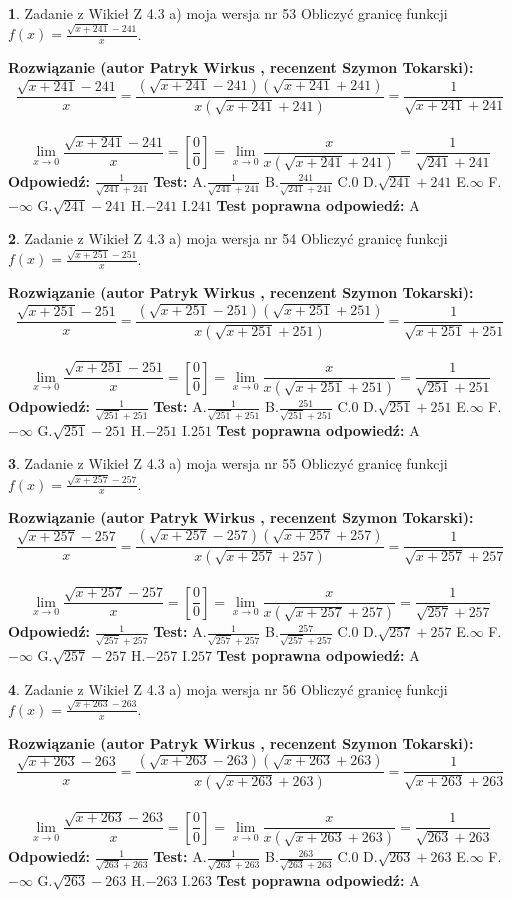 \documentclass[12pt, a4paper]{article}
\theoremstyle{definition} %
\newtheorem{zad}{}
\newcommand{\zadStart}[1]{\begin{zad}#1\newline}
\newcommand{\zadStop}{\end{zad}}
\newcommand{\rozwStart}[2]{\noindent \textbf{Rozwiązanie (autor #1 , recenzent #2): }\newline}
\newcommand{\rozwStop}{\newline}
\newcommand{\odpStart}{\noindent \textbf{Odpowiedź:}\newline}
\newcommand{\odpStop}{\newline}
\newcommand{\testStart}{\noindent \textbf{Test:}\newline}
\newcommand{\testStop}{\newline}
\newcommand{\kluczStart}{\noindent \textbf{Test poprawna odpowiedź:}\newline}
\newcommand{\kluczStop}{\newline}
\begin{document}
\zadStart{Zadanie z Wikieł Z 4.3 a) moja wersja nr 53}
Obliczyć granicę funkcji $f(x)=\frac{\sqrt{x+241}-241}{x}$.
\zadStop
\rozwStart{Patryk Wirkus}{Szymon Tokarski}
$$\frac{\sqrt{x+241}-241}{x}=\frac{(\sqrt{x+241}-241)(\sqrt{x+241}+241)}{x(\sqrt{x+241}+241)}=\frac{1}{\sqrt{x+241}+241}$$
\\
$$\lim\limits_{x\to0}\frac{\sqrt{x+241}-241}{x}=[\frac{0}{0}]=
\lim\limits_{x\to0}\frac{x}{x(\sqrt{x+241}+241)} = \frac{1}{\sqrt{241}+241}$$
\rozwStop
\odpStart
$\frac{1}{\sqrt{241}+241}$
\odpStop
\testStart
A.$\frac{1}{\sqrt{241}+241}$
B.$\frac{241}{\sqrt{241}+241}$
C.$0$
D.$\sqrt{241}+241$
E.$\infty$
F.$-\infty$
G.$\sqrt{241}-241$
H.$-241$
I.$241$
\testStop
\kluczStart
A
\kluczStop



\zadStart{Zadanie z Wikieł Z 4.3 a) moja wersja nr 54}
Obliczyć granicę funkcji $f(x)=\frac{\sqrt{x+251}-251}{x}$.
\zadStop
\rozwStart{Patryk Wirkus}{Szymon Tokarski}
$$\frac{\sqrt{x+251}-251}{x}=\frac{(\sqrt{x+251}-251)(\sqrt{x+251}+251)}{x(\sqrt{x+251}+251)}=\frac{1}{\sqrt{x+251}+251}$$
\\
$$\lim\limits_{x\to0}\frac{\sqrt{x+251}-251}{x}=[\frac{0}{0}]=
\lim\limits_{x\to0}\frac{x}{x(\sqrt{x+251}+251)} = \frac{1}{\sqrt{251}+251}$$
\rozwStop
\odpStart
$\frac{1}{\sqrt{251}+251}$
\odpStop
\testStart
A.$\frac{1}{\sqrt{251}+251}$
B.$\frac{251}{\sqrt{251}+251}$
C.$0$
D.$\sqrt{251}+251$
E.$\infty$
F.$-\infty$
G.$\sqrt{251}-251$
H.$-251$
I.$251$
\testStop
\kluczStart
A
\kluczStop



\zadStart{Zadanie z Wikieł Z 4.3 a) moja wersja nr 55}
Obliczyć granicę funkcji $f(x)=\frac{\sqrt{x+257}-257}{x}$.
\zadStop
\rozwStart{Patryk Wirkus}{Szymon Tokarski}
$$\frac{\sqrt{x+257}-257}{x}=\frac{(\sqrt{x+257}-257)(\sqrt{x+257}+257)}{x(\sqrt{x+257}+257)}=\frac{1}{\sqrt{x+257}+257}$$
\\
$$\lim\limits_{x\to0}\frac{\sqrt{x+257}-257}{x}=[\frac{0}{0}]=
\lim\limits_{x\to0}\frac{x}{x(\sqrt{x+257}+257)} = \frac{1}{\sqrt{257}+257}$$
\rozwStop
\odpStart
$\frac{1}{\sqrt{257}+257}$
\odpStop
\testStart
A.$\frac{1}{\sqrt{257}+257}$
B.$\frac{257}{\sqrt{257}+257}$
C.$0$
D.$\sqrt{257}+257$
E.$\infty$
F.$-\infty$
G.$\sqrt{257}-257$
H.$-257$
I.$257$
\testStop
\kluczStart
A
\kluczStop



\zadStart{Zadanie z Wikieł Z 4.3 a) moja wersja nr 56}
Obliczyć granicę funkcji $f(x)=\frac{\sqrt{x+263}-263}{x}$.
\zadStop
\rozwStart{Patryk Wirkus}{Szymon Tokarski}
$$\frac{\sqrt{x+263}-263}{x}=\frac{(\sqrt{x+263}-263)(\sqrt{x+263}+263)}{x(\sqrt{x+263}+263)}=\frac{1}{\sqrt{x+263}+263}$$
\\
$$\lim\limits_{x\to0}\frac{\sqrt{x+263}-263}{x}=[\frac{0}{0}]=
\lim\limits_{x\to0}\frac{x}{x(\sqrt{x+263}+263)} = \frac{1}{\sqrt{263}+263}$$
\rozwStop
\odpStart
$\frac{1}{\sqrt{263}+263}$
\odpStop
\testStart
A.$\frac{1}{\sqrt{263}+263}$
B.$\frac{263}{\sqrt{263}+263}$
C.$0$
D.$\sqrt{263}+263$
E.$\infty$
F.$-\infty$
G.$\sqrt{263}-263$
H.$-263$
I.$263$
\testStop
\kluczStart
A
\kluczStop
\end{document}

